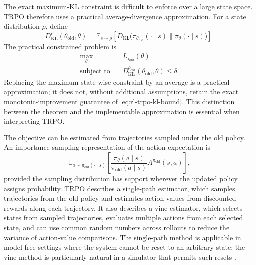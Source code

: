 The exact maximum-KL constraint is difficult to enforce over a large state
space. TRPO therefore uses a practical average-divergence approximation. For a
state distribution $\rho$, define
\begin{equation}
    D_{\mathrm{KL}}^{\rho}(\theta_{\mathrm{old}},\theta)
    =\mathbb{E}_{s\sim\rho}
      \left[
      D_{\mathrm{KL}}\bigl(
      \pi_{\theta_{\mathrm{old}}}(\cdot\mid s)
      \|\pi_\theta(\cdot\mid s)\bigr)
      \right].
    \label{eq:rl-trpo-average-kl}
\end{equation}
The practical constrained problem is
\begin{equation}
    \begin{aligned}
        \max_\theta\quad&L_{\theta_{\mathrm{old}}}(\theta)\\
        \text{subject to}\quad&
        D_{\mathrm{KL}}^{\rho_{\mathrm{old}}}
        (\theta_{\mathrm{old}},\theta)\leq\delta.
    \end{aligned}
    \label{eq:rl-trpo-practical-problem}
\end{equation}
Replacing the maximum state-wise constraint by an average is a practical
approximation; it does not, without additional assumptions, retain the exact
monotonic-improvement guarantee of \cref{eq:rl-trpo-kl-bound}. This distinction
between the theorem and the implementable approximation is essential when
interpreting TRPO.

The objective can be estimated from trajectories sampled under the old policy.
An importance-sampling representation of the action expectation is
\begin{equation}
    \mathbb{E}_{a\sim\pi_{\mathrm{old}}(\cdot\mid s)}
    \left[
    \frac{\pi_\theta(a\mid s)}
         {\pi_{\mathrm{old}}(a\mid s)}
    A^{\pi_{\mathrm{old}}}(s,a)
    \right],
    \label{eq:rl-trpo-importance-ratio}
\end{equation}
provided the sampling distribution has support wherever the updated policy
assigns probability. TRPO describes a single-path estimator, which samples
trajectories from the old policy and estimates action values from discounted
rewards along each trajectory. It also describes a vine estimator, which
selects states from sampled trajectories, evaluates multiple actions from each
selected state, and can use common random numbers across rollouts to reduce the
variance of action-value comparisons. The single-path method is applicable in
model-free settings where the system cannot be reset to an arbitrary state; the
vine method is particularly natural in a simulator that permits such resets
\parencite{schulman2015trpo}.

